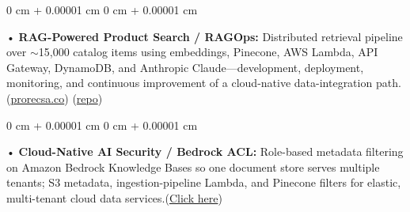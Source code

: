 \documentclass[10pt, letterpaper]{article}
\newenvironment{onecolentry}{
    \begin{adjustwidth}{
        0 cm + 0.00001 cm
    }{
        0 cm + 0.00001 cm
    }
}{
    \end{adjustwidth}
} %
\begin{document}
\begin{onecolentry}
     • \textbf{RAG-Powered Product Search / RAGOps:} Distributed retrieval pipeline over $\sim$15,000 catalog items using embeddings, Pinecone, AWS Lambda, API Gateway, DynamoDB, and Anthropic Claude---development, deployment, monitoring, and continuous improvement of a cloud-native data-integration path.(\href{https://prorecsa.co}{prorecsa.co}) (\href{https://github.com/daedalus-s/ragops-doc}{repo})
\end{onecolentry}
\begin{onecolentry}
     • \textbf{Cloud-Native AI Security / Bedrock ACL:} Role-based metadata filtering on Amazon Bedrock Knowledge Bases so one document store serves multiple tenants; S3 metadata, ingestion-pipeline Lambda, and Pinecone filters for elastic, multi-tenant cloud data services.(\href{https://github.com/daedalus-s/bedrock-acl-metadata}{Click here})
\end{onecolentry}
\vspace{2 pt}
        \vspace{2 pt }
\end{document}
